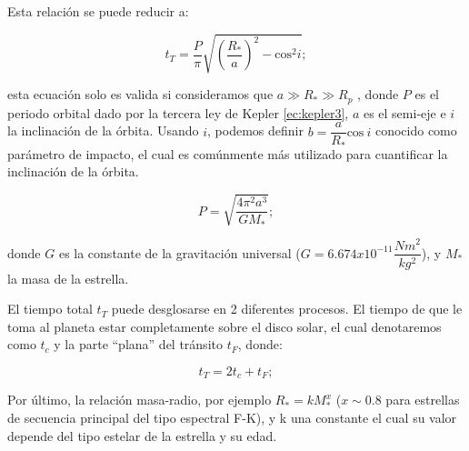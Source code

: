 Esta relación se puede reducir a:

\begin{equation}
\label{ec:tiempoTransitoReduc}
\displaystyle t_{T}=\dfrac{P}{\pi}\sqrt{\left(\dfrac{R_{*}}{a} \right)^{2}- \mbox{cos}^{2}i};
\end{equation}

esta ecuación solo es valida si consideramos que $a\gg R_{*}\gg R_{p}$ \cite{winn2010transits}, donde $P$ es el periodo orbital dado por la tercera ley de Kepler \ref{ec:kepler3}, $a$ es el semi-eje e $i$ la inclinación de la órbita. Usando $i$, podemos definir $b=\dfrac{a}{R_{*}}\mbox{cos}~i$ conocido como parámetro de impacto, el cual es comúnmente más utilizado para cuantificar la inclinación de la órbita. 

\begin{equation}
  \label{ec:kepler3}
  \displaystyle P=\sqrt{\dfrac{4\pi^{2}a^{3}}{GM_{*}}};
  \end{equation} 
  
donde $G$ es la constante de la gravitación universal ($G=6.674x10^{-11}\dfrac{Nm^{2}}{kg^{2}}$), y $M_{*}$ la masa de la estrella.

El tiempo total $t_{T}$ puede desglosarse en 2 diferentes procesos. El tiempo de que le toma al planeta estar completamente sobre el disco solar, el cual denotaremos como $t_{c}$ y la parte ``plana'' del tránsito $t_{F}$, donde:

\begin{equation}
  \label{ec:tiempoTransitoReduc}
  \displaystyle t_{T}=2t_{c}+t_{F};
\end{equation}

Por último, la relación masa-radio, por ejemplo $R_{*}=kM_{*}^{x}$ ($x\sim 0.8$ para estrellas de secuencia principal del tipo espectral F-K), y k una constante el cual su valor depende del tipo estelar de la estrella y su edad. \cite{allen2001allen}

